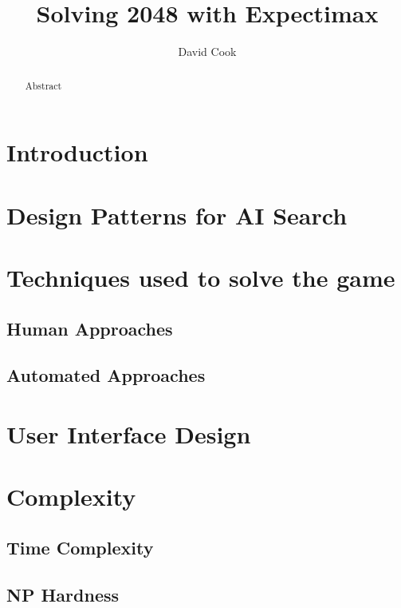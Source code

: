 \documentclass{article}
\title{Solving 2048 with Expectimax}
\author{David Cook}
\begin{document}
\maketitle

\tableofcontents

\begin{abstract}
Abstract
\end{abstract}

\section{Introduction}
\label{sec:intro}

\section{Design Patterns for AI Search}
\label{sec:dp}

\section{Techniques used to solve the game}
\label{sec:techniques}

\subsection{Human Approaches}
\label{subsec:human_techniques}

\subsection{Automated Approaches}
\label{subsec:automated_techniques}

\section{User Interface Design}
\label{sec:ui}

\section{Complexity}
\label{sec:complexity}

\subsection{Time Complexity}
\label{subsec:time_comp}

\subsection{NP Hardness}
\label{subsec:np_hardness}

\end{document}
